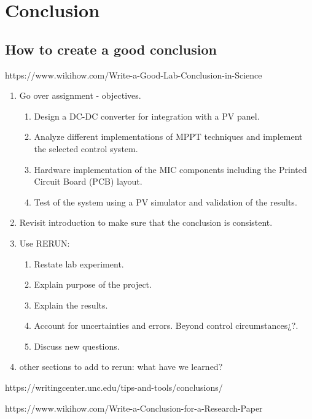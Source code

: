\chapter{Conclusion}\label{ch:conclusion}
\section{How to create a good conclusion}

https://www.wikihow.com/Write-a-Good-Lab-Conclusion-in-Science
\begin{enumerate}
	\item Go over assignment - objectives.  
	\begin{enumerate}
		\item Design a DC-DC converter for integration with a PV panel.
		\item Analyze different implementations of MPPT techniques and implement the selected control system. 
		\item Hardware implementation of the MIC components including the Printed Circuit Board (PCB) layout.
		\item Test of the system using a PV simulator and validation of the results. 
	\end{enumerate}
	\item Revisit introduction to make sure that the conclusion is consistent.
	\item Use RERUN:
	\begin{enumerate}
		\item Restate lab experiment.
		\item Explain purpose of the project.
		\item Explain the results.
		\item Account for uncertainties and errors. Beyond control circumstances¿?.
		\item Discuss new questions.
	\end{enumerate}
	\item other sections to add to rerun: what have we learned?
\end{enumerate}


https://writingcenter.unc.edu/tips-and-tools/conclusions/

https://www.wikihow.com/Write-a-Conclusion-for-a-Research-Paper